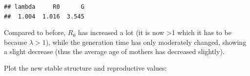\documentclass[
]{book}
\newenvironment{Shaded}{\begin{snugshade}}{\end{snugshade}}
\newcommand{\DecValTok}[1]{\textcolor[rgb]{0.00,0.00,0.81}{#1}}
\newcommand{\FunctionTok}[1]{\textcolor[rgb]{0.00,0.00,0.00}{#1}}
\newcommand{\NormalTok}[1]{#1}
\newcommand{\OtherTok}[1]{\textcolor[rgb]{0.56,0.35,0.01}{#1}}
\newcommand{\SpecialCharTok}[1]{\textcolor[rgb]{0.00,0.00,0.00}{#1}}
\newcommand{\StringTok}[1]{\textcolor[rgb]{0.31,0.60,0.02}{#1}}
\begin{document}
\begin{Shaded}
\end{Shaded}

\begin{verbatim}
## lambda     R0      G 
##  1.004  1.016  3.545
\end{verbatim}

Compared to before, \(R_0\) has increased a lot (it is now \textgreater1 which it has to be because \(\lambda>1\)), while the generation time has only moderately changed, showing a slight decrease (thus the average age of mothers has decreased slightly).

Plot the new stable structure and reproductive values:
\end{document}
